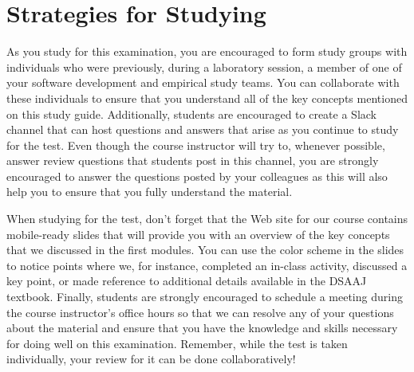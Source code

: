 
\vspace*{-.2in}
\section*{Strategies for Studying}
\vspace*{-.1in}

As you study for this examination, you are encouraged to form study groups with individuals who were previously, during
a laboratory session, a member of one of your software development and empirical study teams. You can collaborate with
these individuals to ensure that you understand all of the key concepts mentioned on this study guide. Additionally,
students are encouraged to create a Slack channel that can host questions and answers that arise as you continue to
study for the test.  Even though the course instructor will try to, whenever possible, answer review questions that
students post in this channel, you are strongly encouraged to answer the questions posted by your colleagues as this
will also help you to ensure that you fully understand the material.

When studying for the test, don't forget that the Web site for our course contains mobile-ready slides that will provide
you with an overview of the key concepts that we discussed in the first modules. You can use the color scheme in the
slides to notice points where we, for instance, completed an in-class activity, discussed a key point, or made reference
to additional details available in the DSAAJ textbook. Finally, students are strongly encouraged to schedule a meeting
during the course instructor's office hours so that we can resolve any of your questions about the material and ensure
that you have the knowledge and skills necessary for doing well on this examination. Remember, while the test is taken
individually, your review for it can be done collaboratively!


